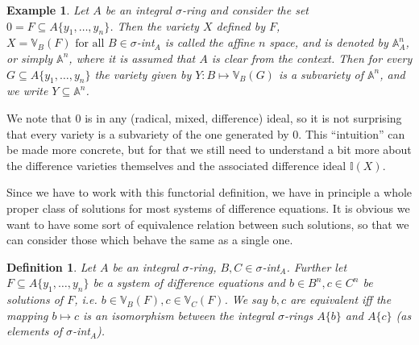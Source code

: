 \documentclass{article}
\def\I{\mathbb{I}}
\def\VV{\mathbb{V}}
\def\s{\sigma}
\def\fa{\text{ for all }}
\theoremstyle{plain}
\newtheorem{ex}[Satz]{Example}
\newtheorem{lem}[Satz]{Lemma}
\newtheorem{defn}[Satz]{Definition}
\theoremstyle{definition}
\begin{document}
\begin{ex}\label{A^n}
Let $A$ be an integral $\s$-ring and consider the set $0 = F \subseteq A\{y_1,\ldots,y_n\}$. Then the variety $X$ defined by $F$, $X = \VV_B(F) \fa B \in \s$-int$_A$ is called the affine $n$ space, and is denoted by $\mathbb{A}^n_A$, 
or simply $\mathbb{A}^n$, where it is assumed that $A$ is clear from the context. Then for every $G \subseteq A\{y_1,\ldots,y_n\}$ the variety given by $Y: B \mapsto \VV_B(G)$ is a subvariety of $\mathbb{A}^n$, 
and we write $Y \subseteq \mathbb{A}^n$.
\end{ex}

We note that $0$ is in any (radical, mixed, difference) ideal, so it is not surprising that every variety is a subvariety of the one generated by $0$. This ``intuition'' can be made more concrete, 
but for that we still need to understand a bit more about the difference varieties themselves and the associated difference ideal $\I(X)$. 

Since we have to work with this functorial definition, we have in principle a whole proper class of solutions for most systems of difference equations. 
It is obvious we want to have some sort of equivalence relation between such solutions, so that we can consider those which behave the same as a single one.

\begin{defn}\label{equivsols}
Let $A$ be an integral $\s$-ring, $B,C \in \s$-int$_A$. Further let $F \subseteq A\{y_1,\ldots,y_n\}$ be a system of difference equations and $b \in B^n, c \in C^n$ be solutions of $F$, i.e. $b \in \VV_B(F), c \in \VV_C(F)$.
We say $b,c$ are equivalent iff the mapping $b \mapsto c$ is an isomorphism between the integral $\s$-rings $A\{b\}$ and $A\{c\}$  (as elements of $\s$-int$_A$). 
\end{defn}

\end{document}
